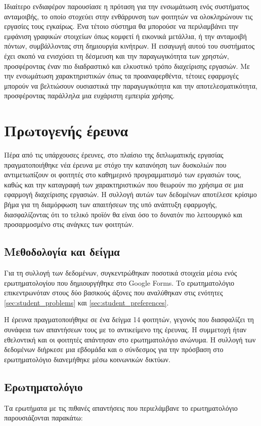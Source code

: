             Ιδιαίτερο ενδιαφέρον παρουσίασε η πρόταση για την ενσωμάτωση ενός συστήματος ανταμοιβής, το οποίο στοχεύει στην ενθάρρυνση των φοιτητών να ολοκληρώνουν τις εργασίες τους εγκαίρως. Ένα τέτοιο σύστημα θα μπορούσε να περιλαμβάνει την εμφάνιση γραφικών στοιχείων όπως κομφετί ή εικονικά μετάλλια, ή την ανταμοιβή πόντων, συμβάλλοντας στη δημιουργία κινήτρων. Η εισαγωγή αυτού του συστήματος έχει σκοπό να ενισχύσει τη δέσμευση και την παραγωγικότητα των χρηστών, προσφέροντας έναν πιο διαδραστικό και ελκυστικό τρόπο διαχείρισης εργασιών. Με την ενσωμάτωση χαρακτηριστικών όπως τα προαναφερθέντα, τέτοιες εφαρμογές μπορούν να βελτιώσουν ουσιαστικά την παραγωγικότητα και την αποτελεσματικότητα, προσφέροντας παράλληλα μια ευχάριστη εμπειρία χρήσης.

    \section{Πρωτογενής έρευνα}
        Πέρα από τις υπάρχουσες έρευνες, στο πλαίσιο της διπλωματικής εργασίας πραγματοποιήθηκε νέα έρευνα με στόχο την κατανόηση των δυσκολιών που αντιμετωπίζουν οι φοιτητές στο καθημερινό προγραμματισμό των εργασιών τους, καθώς και την καταγραφή των χαρακτηριστικών που θεωρούν πιο χρήσιμα σε μια εφαρμογή διαχείρισης εργασιών. Η συλλογή αυτών των δεδομένων αποτέλεσε κρίσιμο βήμα για τη διαμόρφωση των απαιτήσεων της υπό ανάπτυξη εφαρμογής, διασφαλίζοντας ότι το τελικό προϊόν θα είναι όσο το δυνατόν πιο λειτουργικό και προσαρμοσμένο στις ανάγκες των φοιτητών.

        \subsection{Μεθοδολογία και δείγμα}
            Για τη συλλογή των δεδομένων, συγκεντρώθηκαν ποσοτικά στοιχεία μέσω ενός ερωτηματολογίου που δημιουργήθηκε στο Google Forms. Το ερωτηματολόγιο επικεντρωνόταν στους δύο βασικούς άξονες που αναλύθηκαν στις ενότητες \ref{sec:student_problems} και \ref{sec:student_preferences}.

            Η έρευνα πραγματοποιήθηκε σε ένα δείγμα 14 φοιτητών, γεγονός που διασφαλίζει τη συνάφεια των απαντήσεων τους με το αντικείμενο της έρευνας. Η συμμετοχή ήταν εθελοντική και οι φοιτητές απάντησαν στο ερωτηματολόγιο ανώνυμα. Η συλλογή των δεδομένων διήρκεσε μια εβδομάδα και ο σύνδεσμος για την πρόσβαση στο ερωτηματολόγιο διανεμήθηκε μέσω κοινωνικών δικτύων.

        \subsection{Ερωτηματολόγιο} \label{sec:pollstats}
            Τα ερωτήματα με τις πιθανές απαντήσεις που περιελάμβανε το ερωτηματολόγιο παρουσιάζονται παρακάτω:

